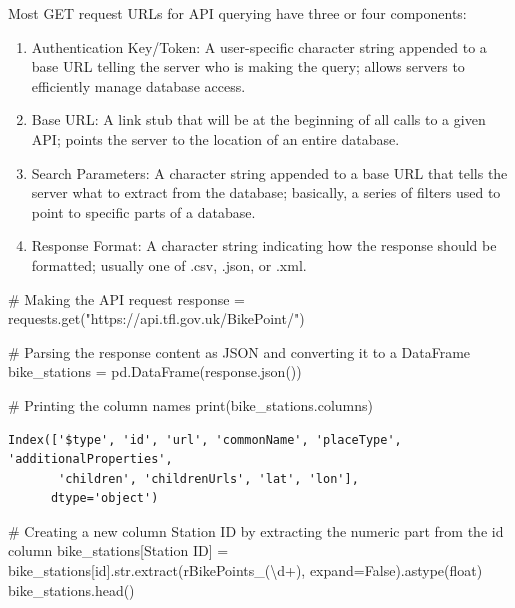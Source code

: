 \documentclass[
  letterpaper,
  DIV=11,
  numbers=noendperiod]{scrreprt}
\newenvironment{Shaded}{\begin{snugshade}}{\end{snugshade}}
\newcommand{\BuiltInTok}[1]{\textcolor[rgb]{0.00,0.23,0.31}{#1}}
\newcommand{\CommentTok}[1]{\textcolor[rgb]{0.37,0.37,0.37}{#1}}
\newcommand{\NormalTok}[1]{\textcolor[rgb]{0.00,0.23,0.31}{#1}}
\newcommand{\OperatorTok}[1]{\textcolor[rgb]{0.37,0.37,0.37}{#1}}
\newcommand{\StringTok}[1]{\textcolor[rgb]{0.13,0.47,0.30}{#1}}
\newcommand{\VariableTok}[1]{\textcolor[rgb]{0.07,0.07,0.07}{#1}}
\newcommand{\VerbatimStringTok}[1]{\textcolor[rgb]{0.13,0.47,0.30}{#1}}
\providecommand{\tightlist}{%
  \setlength{\itemsep}{0pt}\setlength{\parskip}{0pt}}\usepackage{longtable,booktabs,array}
\begin{document}
Most GET request URLs for API querying have three or four components:

\begin{enumerate}
\def\labelenumi{\arabic{enumi}.}
\tightlist
\item
  Authentication Key/Token: A user-specific character string appended to
  a base URL telling the server who is making the query; allows servers
  to efficiently manage database access.
\item
  Base URL: A link stub that will be at the beginning of all calls to a
  given API; points the server to the location of an entire database.
\item
  Search Parameters: A character string appended to a base URL that
  tells the server what to extract from the database; basically, a
  series of filters used to point to specific parts of a database.
\item
  Response Format: A character string indicating how the response should
  be formatted; usually one of .csv, .json, or .xml.
\end{enumerate}

\begin{Shaded}
\begin{Highlighting}[]
\CommentTok{\# Making the API request}
\NormalTok{response }\OperatorTok{=}\NormalTok{ requests.get(}\StringTok{"https://api.tfl.gov.uk/BikePoint/"}\NormalTok{)}

\CommentTok{\# Parsing the response content as JSON and converting it to a DataFrame}
\NormalTok{bike\_stations }\OperatorTok{=}\NormalTok{ pd.DataFrame(response.json())}

\CommentTok{\# Printing the column names}
\BuiltInTok{print}\NormalTok{(bike\_stations.columns)}
\end{Highlighting}
\end{Shaded}

\begin{verbatim}
Index(['$type', 'id', 'url', 'commonName', 'placeType', 'additionalProperties',
       'children', 'childrenUrls', 'lat', 'lon'],
      dtype='object')
\end{verbatim}

\begin{Shaded}
\begin{Highlighting}[]
\CommentTok{\# Creating a new column \textquotesingle{}Station ID\textquotesingle{} by extracting the numeric part from the \textquotesingle{}id\textquotesingle{} column}
\NormalTok{bike\_stations[}\StringTok{\textquotesingle{}Station ID\textquotesingle{}}\NormalTok{] }\OperatorTok{=}\NormalTok{ bike\_stations[}\StringTok{\textquotesingle{}id\textquotesingle{}}\NormalTok{].}\BuiltInTok{str}\NormalTok{.extract(}\VerbatimStringTok{r\textquotesingle{}BikePoints\_(\textbackslash{}d+)\textquotesingle{}}\NormalTok{, expand}\OperatorTok{=}\VariableTok{False}\NormalTok{).astype(}\BuiltInTok{float}\NormalTok{)}
\NormalTok{bike\_stations.head()}
\end{Highlighting}
\end{Shaded}
\end{document}
